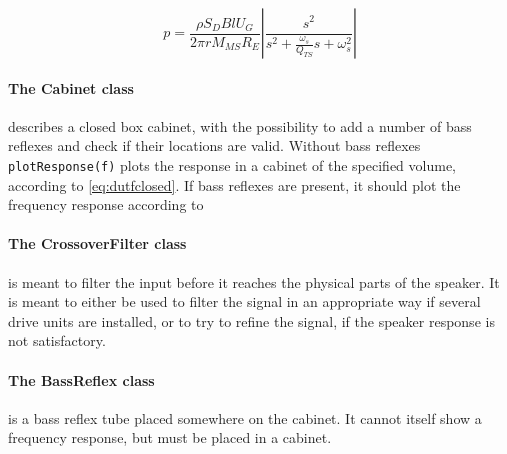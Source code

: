 \begin{equation}
	p = \frac{\rho S_D B l U_G}{2\pi r M_{MS} R_E}\left|\frac{s^2}{s^2 + \frac{\omega_s}{Q_{TS}}s+\omega_s^2}\right|
	\label{eq:transdriveunit}
\end{equation}

\paragraph{The Cabinet class} describes a closed box cabinet, with the possibility to add a number of bass reflexes and check if their locations are valid.
Without bass reflexes \texttt{plotResponse(f)} plots the response in a cabinet of the specified volume, according to \cref{eq:dutfclosed}.
If bass reflexes are present, it should plot the frequency response according to 

\paragraph{The CrossoverFilter class} is meant to filter the input before it reaches the physical parts of the speaker.
It is meant to either be used to filter the signal in an appropriate way if several drive units are installed, or to try to refine the signal, if the speaker response is not satisfactory.

\paragraph{The BassReflex class} is a bass reflex tube placed somewhere on the cabinet.
It cannot itself show a frequency response, but must be placed in a cabinet.